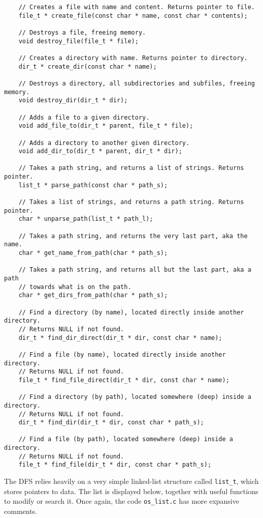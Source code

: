 \documentclass [a4,twoside,11pt] {article}
\begin{document}
    \begin{verbatim}
    // Creates a file with name and content. Returns pointer to file.
    file_t * create_file(const char * name, const char * contents);

    // Destroys a file, freeing memory.
    void destroy_file(file_t * file);

    // Creates a directory with name. Returns pointer to directory.
    dir_t * create_dir(const char * name);

    // Destroys a directory, all subdirectories and subfiles, freeing memory.
    void destroy_dir(dir_t * dir);

    // Adds a file to a given directory.
    void add_file_to(dir_t * parent, file_t * file);

    // Adds a directory to another given directory.
    void add_dir_to(dir_t * parent, dir_t * dir);

    // Takes a path string, and returns a list of strings. Returns pointer.
    list_t * parse_path(const char * path_s);

    // Takes a list of strings, and returns a path string. Returns pointer.
    char * unparse_path(list_t * path_l);
    
    // Takes a path string, and returns the very last part, aka the name.
    char * get_name_from_path(char * path_s);

    // Takes a path string, and returns all but the last part, aka a path
    // towards what is on the path.
    char * get_dirs_from_path(char * path_s);

    // Find a directory (by name), located directly inside another directory.
    // Returns NULL if not found.
    dir_t * find_dir_direct(dir_t * dir, const char * name);

    // Find a file (by name), located directly inside another directory.
    // Returns NULL if not found.
    file_t * find_file_direct(dir_t * dir, const char * name);

    // Find a directory (by path), located somewhere (deep) inside a directory.
    // Returns NULL if not found.
    dir_t * find_dir(dir_t * dir, const char * path_s);

    // Find a file (by path), located somewhere (deep) inside a directory.
    // Returns NULL if not found.
    file_t * find_file(dir_t * dir, const char * path_s);\end{verbatim}

    The DFS relies heavily on a very simple linked-list structure called \texttt{list\_t}, which stores pointers to data. The list is displayed below, together with useful functions to modify or search it. Once again, the code \texttt{os\_list.c} has more expansive comments.
\end{document}

